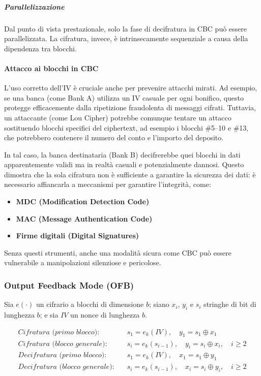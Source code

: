 \documentclass{report}
\begin{document}
    \subparagraph{Parallelizzazione}
    Dal punto di vista prestazionale, solo la fase di decifratura in CBC può essere parallelizzata. La cifratura, invece, è intrinsecamente sequenziale a causa della dipendenza tra blocchi.
    
    \vspace{1em}
    
    \paragraph{Attacco ai blocchi in CBC}
    
    L’uso corretto dell’IV è cruciale anche per prevenire attacchi mirati. Ad esempio, se una banca (come Bank A) utilizza un IV casuale per ogni bonifico, questo protegge efficacemente dalla ripetizione fraudolenta di messaggi cifrati. Tuttavia, un attaccante (come Lou Cipher) potrebbe comunque tentare un attacco sostituendo blocchi specifici del ciphertext, ad esempio i blocchi \#5–10 e \#13, che potrebbero contenere il numero del conto e l’importo del deposito.
    
    In tal caso, la banca destinataria (Bank B) decifrerebbe quei blocchi in dati apparentemente validi ma in realtà casuali e potenzialmente dannosi. Questo dimostra che la sola cifratura non è sufficiente a garantire la sicurezza dei dati: è necessario affiancarla a meccanismi per garantire l’integrità, come:
    
    \begin{itemize}
        \item \textbf{MDC (Modification Detection Code)}
        \item \textbf{MAC (Message Authentication Code)}
        \item \textbf{Firme digitali (Digital Signatures)}
    \end{itemize}
    
    Senza questi strumenti, anche una modalità sicura come CBC può essere vulnerabile a manipolazioni silenziose e pericolose.
    
    \subsubsection{Output Feedback Mode (OFB)}

    Sia \(e(\cdot)\) un cifrario a blocchi di dimensione \(b\); siano \(x_i\), \(y_i\) e \(s_i\) stringhe di bit di lunghezza \(b\); e sia \(IV\) un nonce di lunghezza \(b\).

\begin{align*}
\textit{Cifratura (primo blocco):} \quad & s_1 = e_k(IV), \quad y_1 = s_1 \oplus x_1 \\
\textit{Cifratura (blocco generale):} \quad & s_i = e_k(s_{i-1}), \quad y_i = s_i \oplus x_i, \quad i \geq 2 \\
\textit{Decifratura (primo blocco):} \quad & s_1 = e_k(IV), \quad x_1 = s_1 \oplus y_1 \\
\textit{Decifratura (blocco generale):} \quad & s_i = e_k(s_{i-1}), \quad x_i = s_i \oplus y_i, \quad i \geq 2
\end{align*}
\end{document}
